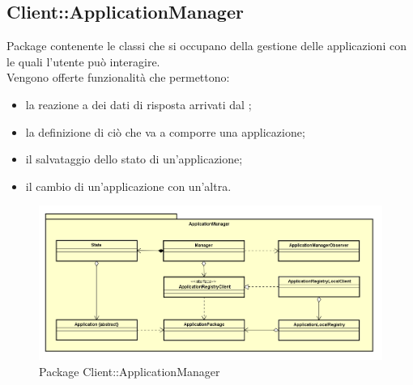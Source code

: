 \subsection{Client::ApplicationManager}
Package contenente le classi che si occupano della gestione delle applicazioni con le quali l'utente può interagire.\\ Vengono offerte funzionalità che permettono: \begin{itemize} \item la reazione a dei dati di risposta arrivati dal ; \item la definizione di ciò che va a comporre una applicazione; \item il salvataggio dello stato di un'applicazione; \item il cambio di un'applicazione con un'altra. \end{itemize}
\begin{figure}[h] \centering \includegraphics[width=\textwidth,height=\textheight,keepaspectratio]{images/diagrams/client/Client/ApplicationManager.png}
\caption{Package Client::ApplicationManager}
\end{figure}
\newpage


